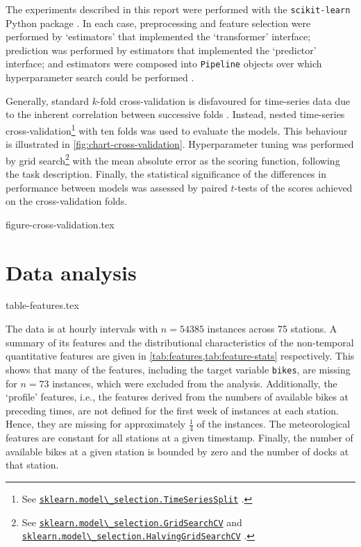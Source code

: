 \documentclass[11pt]{extarticle}
\newcommand{\sklearn}[1]{
  \href{https://scikit-learn.org/stable/modules/generated/sklearn.#1.html}{\lstinline|sklearn.#1|}
}
\begin{document}
The experiments described in this report were performed with the \texttt{scikit-learn}
Python package \parencite{Pedregosa2011}.
In each case, preprocessing and feature selection were performed by `estimators' that
implemented the `transformer' interface; prediction was performed by estimators that
implemented the `predictor' interface; and estimators were composed into
\texttt{Pipeline} objects over which hyperparameter search could be performed
\parencite[4-9]{Buitinck2013}.

Generally, standard $k$-fold cross-validation is disfavoured for time-series data due
to the inherent correlation between successive folds \parencite{Bergmeir2018}.
Instead, nested time-series
cross-validation\footnote{See \sklearn{model\_selection.TimeSeriesSplit}.} with ten folds
was used to evaluate the models.
This behaviour is illustrated in \cref{fig:chart-cross-validation}.
Hyperparameter tuning was performed by grid
search\footnote{See \sklearn{model\_selection.GridSearchCV} and \sklearn{model\_selection.HalvingGridSearchCV}.}
with the mean absolute error as the scoring function, following the task description.
Finally, the statistical significance of the differences in performance between models
was assessed by paired $t$-tests of the scores achieved on the cross-validation
folds.

{figure-cross-validation.tex}

\section{Data analysis}
\label{sec:data-analysis}

{table-features.tex}

The data is at hourly intervals with $n = 54385$ instances across 75 stations.
A summary of its features and the distributional characteristics of the non-temporal
quantitative features are given in \cref{tab:features,tab:feature-stats} respectively.
This shows that many of the features, including the target variable
\texttt{bikes}, are missing for $n = 73$ instances, which were excluded from the analysis.
Additionally, the `profile' features, i.e., the features derived from the numbers of
available bikes at preceding times, are not defined for the first week of instances at
each station.
Hence, they are missing for approximately $\frac{1}{4}$ of the instances.
The meteorological features are constant for all stations at a given timestamp.
Finally, the number of available bikes at a given station is bounded by zero and the
number of docks at that station.
\end{document}
